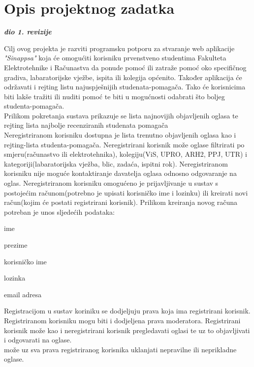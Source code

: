 \chapter{Opis projektnog zadatka}
		
		\textbf{\textit{dio 1. revizije}}\\
		
		{Cilj ovog projekta je razviti programsku potporu za stvaranje web aplikacije \textit{"Sinappsa"} koja će omogućiti korisniku prvenstveno studentima Fakulteta Elektrotehnike i Računastva da ponude pomoć ili zatraže pomoć oko specifičnog gradiva, labaratorijske vježbe, ispita ili kolegija općenito. Također aplikacija će održavati i rejting listu najuspješnijih studenata-pomagača. Tako će korisnicima biti lakše tražiti ili nuditi pomoć te biti u mogućnosti odabrati što boljeg studenta-pomagača.
		\\
		\indent Prilikom pokretanja sustava prikazuje se lista najnovijih objavljenih oglasa te rejting lista najbolje recenziranih studenata pomagača
		\\
		\indent Neregistriranom korisniku dostupna je lista trenutno objavljenih oglasa kao i rejting-lista studenta-pomagača. Neregistrirani korisnik može oglase filtrirati po smjeru(računastvo ili elektrotehnika), kolegiju(ViS, UPRO, ARH2, PPJ, UTR) i kategoriji(labaratorijska vježba, blic, zadaća, ispitni rok). Neregistriranom korisniku nije moguće kontaktiranje davatelja oglasa odnosno odgovaranje na oglas. Neregistriranom korisniku omogućeno je prijavljivanje u sustav s postojećim računom(potrebno je upisati korisničko ime i lozinku) ili kreirati novi račun(kojim će postati registrirani korisnik). Prilikom kreiranja novog računa potreban je unos sljedećih podataka: 
		\begin{packed_item}
			
			\item  ime
			\item  prezime
			\item  korisničko ime
			\item  lozinka
			\item  email adresa

		\end{packed_item}
		\indent Registracijom u sustav koriniku se dodjeljuju prava koja ima registrirani korisnik. Registriranom korisniku mogu biti i dodjeljena prava moderatora. Registrirani korisnik može kao i neregistrirani korisnik pregledavati oglasi te uz to objavljivati i odgovarati na oglase.\\
		\indent {} može uz sva prava registriranog korisnika uklanjati nepravilne ili neprikladne oglase. 
		}
		
		
	